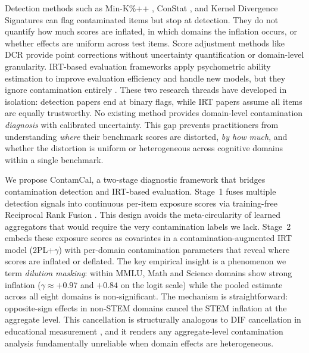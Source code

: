 Detection methods such as Min-K\%++ \citep{zhang_2024_minkpp}, ConStat \citep{dekoninck_2024_constat}, and Kernel Divergence Signatures \citep{choi_2025_kds} can flag contaminated items but stop at detection. They do not quantify how much scores are inflated, in which domains the inflation occurs, or whether effects are uniform across test items. Score adjustment methods like DCR \citep{xu2025dcr} provide point corrections without uncertainty quantification or domain-level granularity. IRT-based evaluation frameworks \citep{polo_2024_tinybenchmarks,habba_2025_growing_pains} apply psychometric ability estimation to improve evaluation efficiency and handle new models, but they ignore contamination entirely \citep{lalor_2024_irt_nlp}. These two research threads have developed in isolation: detection papers end at binary flags, while IRT papers assume all items are equally trustworthy. No existing method provides domain-level contamination \textit{diagnosis} with calibrated uncertainty. This gap prevents practitioners from understanding \textit{where} their benchmark scores are distorted, \textit{by how much}, and whether the distortion is uniform or heterogeneous across cognitive domains within a single benchmark.

We propose ContamCal, a two-stage diagnostic framework that bridges contamination detection and IRT-based evaluation. Stage~1 fuses multiple detection signals into continuous per-item exposure scores via training-free Reciprocal Rank Fusion \citep{cormack_2009_rrf}. This design avoids the meta-circularity of learned aggregators that would require the very contamination labels we lack. Stage~2 embeds these exposure scores as covariates in a contamination-augmented IRT model (2PL+$\gamma$) with per-domain contamination parameters that reveal where scores are inflated or deflated. The key empirical insight is a phenomenon we term \textit{dilution masking}: within MMLU, Math and Science domains show strong inflation ($\gamma \approx +0.97$ and $+0.84$ on the logit scale) while the pooled estimate across all eight domains is non-significant. The mechanism is straightforward: opposite-sign effects in non-STEM domains cancel the STEM inflation at the aggregate level. This cancellation is structurally analogous to DIF cancellation in educational measurement \citep{ercikan_2008_dif_cancellation}, and it renders any aggregate-level contamination analysis fundamentally unreliable when domain effects are heterogeneous.

